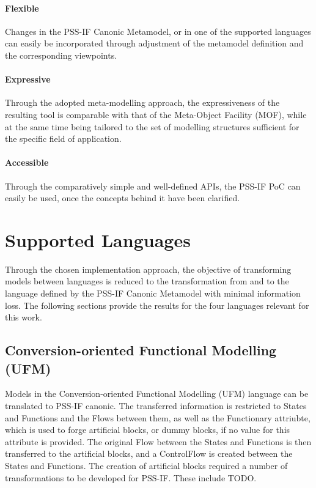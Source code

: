 \paragraph{Flexible} Changes in the PSS-IF Canonic Metamodel, or in one of the supported languages can easily be incorporated through adjustment of the metamodel definition and the corresponding viewpoints.

\paragraph{Expressive} Through the adopted meta-modelling approach, the expressiveness of the resulting tool is comparable with that of the Meta-Object Facility (MOF), while at the same time being tailored to the set of modelling structures sufficient for the specific field of application.

\paragraph{Accessible} Through the comparatively simple and well-defined APIs, the PSS-IF PoC can easily be used, once the concepts behind it have been clarified.

\section{Supported Languages}
\label{sec:results:languages}

Through the chosen implementation approach, the objective of transforming models between languages is reduced to the transformation from and to the language defined by the PSS-IF Canonic Metamodel with minimal information loss. The following sections provide the results for the four languages relevant for this work.

\subsection{Conversion-oriented Functional Modelling (UFM)}

Models in the Conversion-oriented Functional Modelling (UFM) language can be translated to PSS-IF canonic. The transferred information is restricted to States and Functions and the Flows between them, as well as the Functionary attriubte, which is used to forge artificial blocks, or dummy blocks, if no value for this attribute is provided. The original Flow between the States and Functions is then transferred to the artificial blocks, and a ControlFlow is created between the States and Functions. The creation of artificial blocks required a number of transformations to be developed for PSS-IF. These include \color{red}TODO\color{black}.

